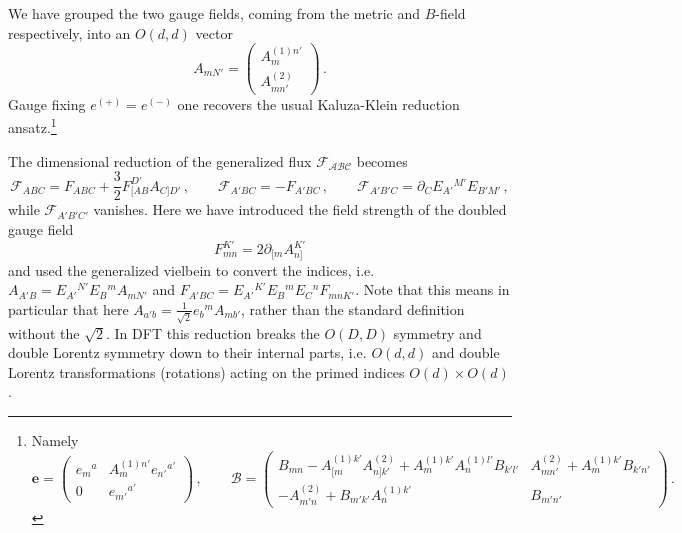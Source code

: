 \documentclass[a4paper,11pt]{article}
\begin{document}
We have grouped the two gauge fields, coming from the metric and $B$-field respectively, into an $O(d,d)$ vector
\begin{equation}
A_{mN'}=
\left(
\begin{array}{c}
A_m^{(1)n'}\\
A_{mn'}^{(2)}
\end{array}
\right)\,.
\end{equation}
Gauge fixing $e^{(+)}=e^{(-)}$ one recovers the usual Kaluza-Klein reduction ansatz.\footnote{Namely
$$
\bm e=
\left(
\begin{array}{cc}
e_m{}^a & A^{(1)n'}_{m}e_{n'}{}^{a'}\\
0 & e_{m'}{}^{a'}
\end{array}
\right)\,,\qquad
\mathcal B=
\left(
\begin{array}{cc}
B_{mn}-A_{[m}^{(1)k'}A^{(2)}_{n]k'}+A_m^{(1)k'}A_n^{(1)l'}B_{k'l'} & A^{(2)}_{mn'}+A_m^{(1)k'}B_{k'n'}\\
-A^{(2)}_{m'n}+B_{m'k'}A_n^{(1)k'} & B_{m'n'}
\end{array}
\right)\,.
%
%
%
%
%
$$
}

The dimensional reduction of the generalized flux $\mathcal{ F_{ABC}}$ becomes
\begin{equation}
\mathcal F_{ABC}=F_{ABC}+\frac32F_{[AB}^{D'}A_{C]D'}
\,,\qquad
\mathcal F_{A'BC}=-F_{A'BC}
\,,\qquad
\mathcal F_{A'B'C}=\partial_CE_{A'}{}^{M'}E_{B'M'}\,,
\label{eq:F-red}
\end{equation}
while $\mathcal F_{A'B'C'}$ vanishes. Here we have introduced the field strength of the doubled gauge field
\begin{equation}
F_{mn}^{K'}=2\partial_{[m}A_{n]}^{K'}
\end{equation}
and used the generalized vielbein to convert the indices, i.e. $A_{A'B}=E_{A'}{}^{N'}E_B{}^mA_{mN'}$ and $F_{A'BC}=E_{A'}{}^{K'}E_{B}{}^mE_{C}{}^nF_{mnK'}$. Note that this means in particular that here $A_{a'b}=\frac{1}{\sqrt2}e_b{}^mA_{mb'}$, rather than the standard definition without the $\sqrt2$. In DFT this reduction breaks the $O(D,D)$ symmetry and double Lorentz symmetry down to their internal parts, i.e. $O(d,d)$ and double Lorentz transformations (rotations) acting on the primed indices $O(d)\times O(d)$.
\end{document}
